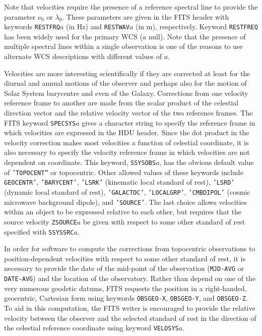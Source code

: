 \documentclass[twoside]{article}
\newcommand{\keyw}[1]{\hbox{{\tt #1}}}
\begin{document}
Note that velocities require the presence of a reference spectral line
to provide the parameter $\nu_0$ or $\lambda_0$.  These parameters are
given in the FITS header with keywords \keyw{RESTFRQ$a$} (in Hz) and
\keyw{RESTWAV$a$} (in m), respectively.  Keyword \keyw{RESTFREQ} has
been widely used for the primary WCS ($a$ null).  Note that the
presence of multiple spectral lines within a single observation is one
of the reasons to use alternate WCS descriptions with different values
of $a$.

Velocities are more interesting scientifically if they are corrected
at least for the diurnal and annual motions of the observer and
perhaps also for the motion of Solar System barycentre and even of the
Galaxy.  Corrections from one velocity reference frame to another are
made from the scalar product of the celestial direction vector and the
relative velocity vector of the two reference frames.  The FITS
keyword \keyw{SPECSYS$a$} gives a character string to specify the
reference frame in which velocities are expressed in the HDU header.
Since the dot product in the velocity correction makes most velocities
a function of celestial coordinate, it is also necessary to specify
the velocity reference frame in which velocities are not dependent on
coordinate.  This keyword, \keyw{SSYSOBS$a$}, has the obvious default
value of \keyw{'TOPOCENT''} or topocentric.  Other allowed values of
these keywords include \keyw{GEOCENTR'}, \keyw{'BARYCENT'},
\keyw{'LSRK'} (kinematic local standard of rest), \keyw{'LSRD'}
(dynamic local standard of rest), \keyw{'GALACTOC'},
\keyw{'LOCALGRP'}, \keyw{'CMBDIPOL'} (cosmic microwave background
dipole), and \keyw{'SOURCE'}\@.  The last choice allows velocities
within an object to be expressed relative to each other, but requires
that the source velocity \keyw{ZSOURCE$a$} be given with respect to
some other standard of rest specified with \keyw{SSYSSRC$a$}\@.

In order for software to compute the corrections from topocentric
observations to position-dependent velocities with respect to some
other standard of rest, it is necessary to provide the date of the
mid-point of the observation (\keyw{MJD-AVG} or \keyw{DATE-AVG}) and the
location of the observatory.  Rather than depend on one of the very
numerous geodetic datums, FITS requests the position in a
right-handed, geocentric, Cartesian form using keywords \keyw{OBSGEO-X},
\keyw{OBSGEO-Y}, and \keyw{OBSGEO-Z}\@.  To aid in this computation, the
FITS writer is encouraged to provide the relative velocity between the
observer and the selected standard of rest in the direction of the
celestial reference coordinate using keyword \keyw{VELOSYS$a$}\@.
\end{document}
